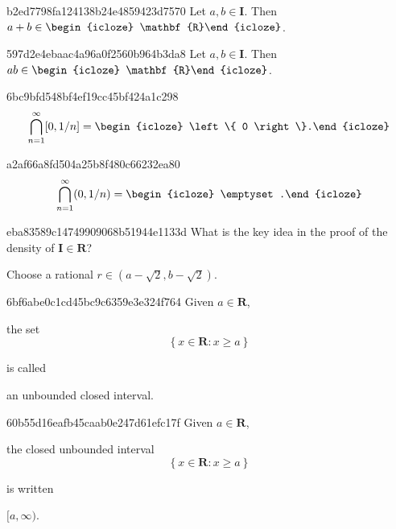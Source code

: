 \begin{note}{b2ed7798fa124138b24e4859423d7570}
    Let \({ a, b \in \mathbf{I} }\).
    Then \({ a + b \in \begin{icloze}{1}\mathbf{R}\end{icloze} }\).
\end{note}

\begin{note}{597d2e4ebaac4a96a0f2560b964b3da8}
    Let \({ a, b \in \mathbf{I} }\).
    Then \({ ab \in \begin{icloze}{1}\mathbf{R}\end{icloze} }\).
\end{note}

\begin{note}{6bc9bfd548bf4ef19cc45bf424a1c298}
    \[
        \bigcap_{n = 1}^{\infty} [0, 1/n] = \begin{icloze}{1}\left\{ 0 \right\}.\end{icloze}
    \]
\end{note}

\begin{note}{a2af66a8fd504a25b8f480c66232ea80}
    \[
        \bigcap_{n = 1}^{\infty} (0, 1/n) = \begin{icloze}{1}\emptyset.\end{icloze}
    \]
\end{note}

\begin{note}{eba83589c14749909068b51944e1133d}
    What is the key idea in the proof of the density of \({ \mathbf{I} \in \mathbf{R} }\)?

    \begin{cloze}{1}
        Choose a rational \({ r \in (a - \sqrt{2}, b - \sqrt{2}) }\).
    \end{cloze}
\end{note}

\begin{note}{6bf6abe0c1cd45bc9c6359e3e324f764}
    Given \({ a \in \mathbf{R} }\),
    \begin{icloze}{2}
        the set
        \[
            \left\{ x \in \mathbf{R} : x \geq a \right\}
        \]
    \end{icloze}
    is called \begin{icloze}{1}an unbounded closed interval.\end{icloze}
\end{note}

\begin{note}{60b55d16eafb45caab0e247d61efc17f}
    Given \({ a \in \mathbf{R} }\),
    \begin{icloze}{2}
        the closed unbounded interval
        \[
            \left\{ x \in \mathbf{R} : x \geq a \right\}
        \]
    \end{icloze}
    is written \begin{icloze}{1}\({ [a, \infty) }\).\end{icloze}
\end{note}

